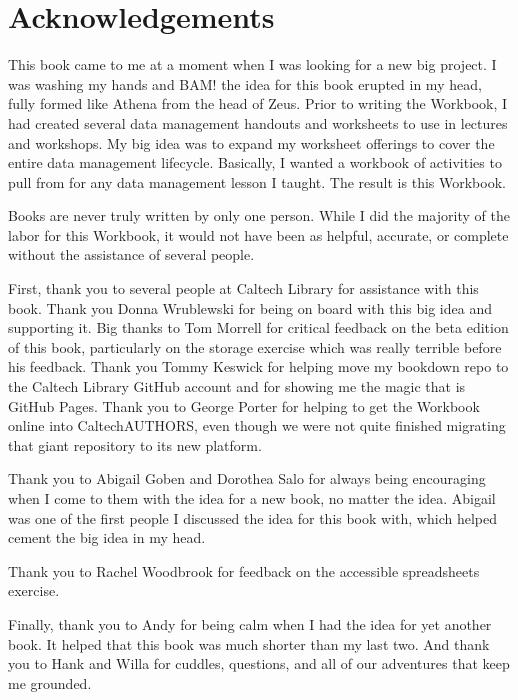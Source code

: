 \documentclass[
]{book}
\begin{document}
\hypertarget{acknowledgements}{%
\chapter*{Acknowledgements}\label{acknowledgements}}

This book came to me at a moment when I was looking for a new big project. I was washing my hands and BAM! the idea for this book erupted in my head, fully formed like Athena from the head of Zeus. Prior to writing the Workbook, I had created several data management handouts and worksheets to use in lectures and workshops. My big idea was to expand my worksheet offerings to cover the entire data management lifecycle. Basically, I wanted a workbook of activities to pull from for any data management lesson I taught. The result is this Workbook.

Books are never truly written by only one person. While I did the majority of the labor for this Workbook, it would not have been as helpful, accurate, or complete without the assistance of several people.

First, thank you to several people at Caltech Library for assistance with this book. Thank you Donna Wrublewski for being on board with this big idea and supporting it. Big thanks to Tom Morrell for critical feedback on the beta edition of this book, particularly on the storage exercise which was really terrible before his feedback. Thank you Tommy Keswick for helping move my bookdown repo to the Caltech Library GitHub account and for showing me the magic that is GitHub Pages. Thank you to George Porter for helping to get the Workbook online into CaltechAUTHORS, even though we were not quite finished migrating that giant repository to its new platform.

Thank you to Abigail Goben and Dorothea Salo for always being encouraging when I come to them with the idea for a new book, no matter the idea. Abigail was one of the first people I discussed the idea for this book with, which helped cement the big idea in my head.

Thank you to Rachel Woodbrook for feedback on the accessible spreadsheets exercise.

Finally, thank you to Andy for being calm when I had the idea for yet another book. It helped that this book was much shorter than my last two. And thank you to Hank and Willa for cuddles, questions, and all of our adventures that keep me grounded.

  
\end{document}
